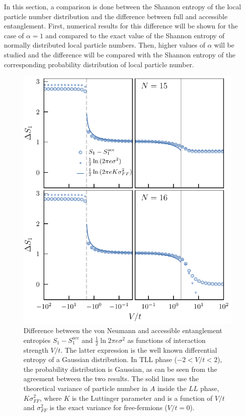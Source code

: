 In this section, a comparison is done between the Shannon entropy of the local particle number distribution and the difference between full and accessible entanglement. First, numerical results for this difference will be shown for the case of $\alpha=1$ and compared to the exact value of the Shannon entropy of normally distributed local particle numbers. Then, higher values of $\alpha$ will be studied and the difference will be compared with the Shannon entropy of the corresponding probability distribution of local particle number.

\begin{figure}[h!]
\begin{center}
\includegraphics[scale=1.0]{deltaS1_N15N16.pdf}
\end{center}
\caption{Difference between the von Neumann and accessible entanglement entropies $S_{1}-S_{1}^{acc}$ and $\frac{1}{2} \ln 2 \pi e \sigma^2$ as functions of interaction strength $V/t$. The latter expression is the well known differential entropy of a Gaussian distribution. In TLL phase ($-2 < V/t < 2$), the probability distribution is Gaussian, as can be seen from the agreement between the two results. The solid lines use the theoretical variance of particle number in $A$ inside the $LL$ phase, $K \sigma^2_{FF}$, where $K$ is the Luttinger parameter and is a function of $V/t$ and $\sigma^2_{FF}$ is the exact variance for free-fermions ($V/t = 0$).}
\label{fig:deltaS1}
\end{figure}

